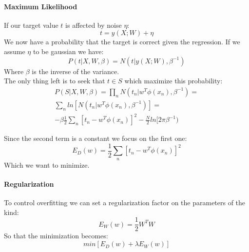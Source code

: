 \paragraph{Maximum Likelihood}
If our target value $t$ is affected by noise $\eta$:
$$t=y(X;W)+\eta$$
We now have a probability that the target is correct given the regression. If we assume $\eta$ to be gaussian we have:
$$P(t|X,W,\beta)=N(t|y(X;W),\beta^{-1})$$
Where $\beta$ is the inverse of the variance.\\
The only thing left is to seek that $t \in S$ which maximize this probability:
\begin{equation}
\begin{aligned}
P(S|X,W,\beta)=\prod_n N(t_n|w^T\phi(x_n),\beta^{-1})=\\
\sum_n ln[N(t_n|w^T\phi(x_n),\beta^{-1})]=\\
-\beta \frac{1}{2}\sum_n[t_n-w^T \phi(x_n)]^2-\frac{N}{2}ln[2\pi\beta^{-1})
\end{aligned}
\end{equation}
 
Since the second term is a constant we focus on the first one:
$$E_D(w)= \frac{1}{2}\sum_n[t_n-w^T \phi(x_n)]^2$$
Which we want to minimize.

\paragraph{Regularization}
To control overfitting we can set a regularization factor on the parameters of the kind:
$$E_W(w)=\frac{1}{2}W^TW$$
So that the minimization becomes:
$$min[E_D(w)+\lambda E_W(w)]$$

